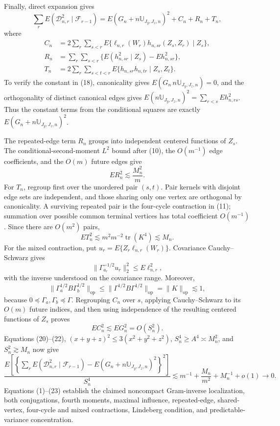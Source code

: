 Finally, direct expansion gives
\[
\sum_rE(\mathcal D_{n,r}^2\mid\mathcal F_{r-1})
=E(G_n+n\mathbb U_{J_y,J_z,n})^2+C_n+R_n+T_n, \tag{18}
\]
where
\[
\begin{split}
C_n&=2\sum_r\sum_{s<r}E\{\ell_{n,r}(W_r)h_{n,sr}(Z_s,Z_r)\mid Z_s\},\\
R_n&=\sum_r\sum_{s<r}\{E(h_{n,sr}^2\mid Z_s)-Eh_{n,sr}^2\},\\
T_n&=2\sum_r\sum_{s<t<r}E\{h_{n,sr}h_{n,tr}\mid Z_s,Z_t\}.
\end{split} \tag{19}
\]
To verify the constant in (18), canonicality gives \(E(G_n\,n\mathbb U_{J_y,J_z,n})=0\), and the orthogonality of distinct canonical edges gives \(E(n\mathbb U_{J_y,J_z,n})^2=\sum_{r<s}Eh_{n,rs}^2\). Thus the constant terms from the conditional squares are exactly \(E(G_n+n\mathbb U_{J_y,J_z,n})^2\).

The repeated-edge term \(R_n\) groups into independent centered functions of \(Z_s\). The conditional-second-moment \(L^2\) bound after (10), the \(O(m^{-1})\) edge coefficients, and the \(O(m)\) future edges give
\[
ER_n^2\lesssim\frac{M_n^2}{m}. \tag{20}
\]
For \(T_n\), regroup first over the unordered pair \((s,t)\). Pair kernels with disjoint edge sets are independent, and those sharing only one vertex are orthogonal by canonicality. A surviving repeated pair is the four-cycle contraction in (11); summation over possible common terminal vertices has total coefficient \(O(m^{-1})\). Since there are \(O(m^2)\) pairs,
\[
ET_n^2\lesssim m^2m^{-2}\operatorname{tr}(K^4)\lesssim M_n. \tag{21}
\]
For the mixed contraction, put \(u_r=E\{Z_r\ell_{n,r}(W_r)\}\). Covariance Cauchy--Schwarz gives
\[
\|\Gamma_{a_r}^{-1/2}u_r\|_2^2\le E\ell_{n,r}^2,
\]
with the inverse understood on the covariance range. Moreover,
\[
\|\Gamma_a^{1/2}B\Gamma_b^{1/2}\|_{\mathrm{op}}
\le\|\Gamma^{1/2}B\Gamma^{1/2}\|_{\mathrm{op}}
=\|K\|_{\mathrm{op}}\lesssim1,
\]
because \(0\preceq\Gamma_a,\Gamma_b\preceq\Gamma\). Regrouping \(C_n\) over \(s\), applying Cauchy--Schwarz to its \(O(m)\) future indices, and then using independence of the resulting centered functions of \(Z_s\) proves
\[
EC_n^2\lesssim EG_n^2=O(S_n^2). \tag{22}
\]
Equations (20)--(22), \((x+y+z)^2\le3(x^2+y^2+z^2)\), \(S_n^4\ge A^4\asymp M_n^2\), and \(S_n^2\gtrsim M_n\) now give
\[
\frac{E\left[\left\{\sum_rE(\mathcal D_{n,r}^2\mid\mathcal F_{r-1})
-E(G_n+n\mathbb U_{J_y,J_z,n})^2\right\}^2\right]}{S_n^4}
\lesssim m^{-1}+\frac{M_n}{m^2}+M_n^{-1}+o(1)\longrightarrow0. \tag{23}
\]
Equations (1)--(23) establish the claimed noncompact Gram-inverse localization, both conjugations, fourth moments, maximal influence, repeated-edge, shared-vertex, four-cycle and mixed contractions, Lindeberg condition, and predictable-variance concentration.